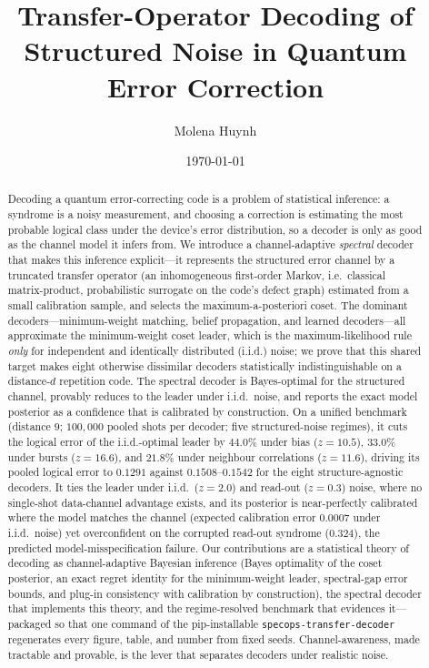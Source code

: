 \documentclass[reprint,aps,prxquantum,amsmath,amssymb,floatfix,nofootinbib,longbibliography]{revtex4-2}
\theoremstyle{definition}
\theoremstyle{remark}
\theoremstyle{plain}
\newcommand{\sync}[1]{#1}
\begin{document}
\title{Transfer-Operator Decoding of Structured Noise in Quantum Error Correction}

\author{Molena Huynh}

\date{\today}

\begin{abstract}
Decoding a quantum error-correcting code is a problem of statistical inference: a syndrome is a noisy measurement, and choosing a correction is estimating the most probable logical class under the device's error distribution, so a decoder is only as good as the channel model it infers from. We introduce a channel-adaptive \emph{spectral} decoder that makes this inference explicit---it represents the structured error channel by a truncated transfer operator (an inhomogeneous first-order Markov, i.e.\ classical matrix-product, probabilistic surrogate on the code's defect graph) estimated from a small calibration sample, and selects the maximum-a-posteriori coset. The dominant decoders---minimum-weight matching, belief propagation, and learned decoders---all approximate the minimum-weight coset leader, which is the maximum-likelihood rule \emph{only} for independent and identically distributed (i.i.d.) noise; we prove that this shared target makes eight otherwise dissimilar decoders statistically indistinguishable on a distance-$d$ repetition code. The spectral decoder is Bayes-optimal for the structured channel, provably reduces to the leader under i.i.d.\ noise, and reports the exact model posterior as a confidence that is calibrated by construction. On a unified benchmark (distance $\sync{9}$; $\sync{100{,}000}$ pooled shots per decoder; five structured-noise regimes), it cuts the logical error of the i.i.d.-optimal leader by $\sync{44.0}\%$ under bias ($z=\sync{10.5}$), $\sync{33.0}\%$ under bursts ($z=\sync{16.6}$), and $\sync{21.8}\%$ under neighbour correlations ($z=\sync{11.6}$), driving its pooled logical error to $\sync{0.1291}$ against $\sync{0.1508}$--$\sync{0.1542}$ for the eight structure-agnostic decoders. It ties the leader under i.i.d.\ ($z=\sync{2.0}$) and read-out ($z=\sync{0.3}$) noise, where no single-shot data-channel advantage exists, and its posterior is near-perfectly calibrated where the model matches the channel (expected calibration error $\sync{0.0007}$ under i.i.d.\ noise) yet overconfident on the corrupted read-out syndrome ($\sync{0.324}$), the predicted model-misspecification failure. Our contributions are a statistical theory of decoding as channel-adaptive Bayesian inference (Bayes optimality of the coset posterior, an exact regret identity for the minimum-weight leader, spectral-gap error bounds, and plug-in consistency with calibration by construction), the spectral decoder that implements this theory, and the regime-resolved benchmark that evidences it---packaged so that one command of the pip-installable \texttt{specops-transfer-decoder} regenerates every figure, table, and number from fixed seeds. Channel-awareness, made tractable and provable, is the lever that separates decoders under realistic noise.
\end{abstract}
\end{document}
